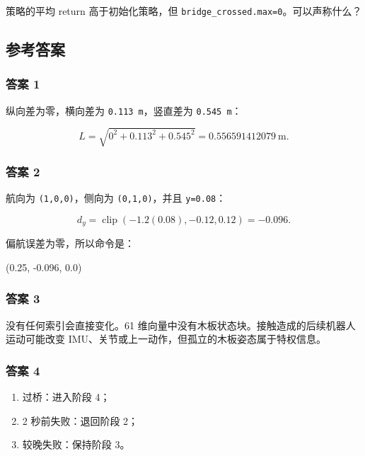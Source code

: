 \documentclass[
  chinese,
  11pt,
  letterpaper,
]{article}
\newenvironment{Shaded}{\begin{snugshade}}{\end{snugshade}}
\newcommand{\NormalTok}[1]{#1}
\providecommand{\tightlist}{%
  \setlength{\itemsep}{0pt}\setlength{\parskip}{0pt}}
\renewenvironment{Shaded}{\par\smallskip}{\par\smallskip}
\begin{document}
策略的平均 return 高于初始化策略，但
\texttt{bridge\_crossed.max=0}。可以声称什么？

\subsection{参考答案}\label{ux53c2ux8003ux7b54ux6848-1}

\subsubsection{答案 1}\label{ux7b54ux6848-1}

纵向差为零，横向差为 \texttt{0.113\ m}，竖直差为 \texttt{0.545\ m}：

\[
L=\sqrt{0^2+0.113^2+0.545^2}
=0.556591412079\ \text{m}.
\]

\subsubsection{答案 2}\label{ux7b54ux6848-2}

航向为 \texttt{(1,0,0)}，侧向为 \texttt{(0,1,0)}，并且 \texttt{y=0.08}：

\[
d_y=\operatorname{clip}(-1.2(0.08),-0.12,0.12)
=-0.096.
\]

偏航误差为零，所以命令是：

\begin{Shaded}
\begin{Highlighting}[]
\NormalTok{(0.25, {-}0.096, 0.0)}
\end{Highlighting}
\end{Shaded}

\subsubsection{答案 3}\label{ux7b54ux6848-3}

没有任何索引会直接变化。61
维向量中没有木板状态块。接触造成的后续机器人运动可能改变
IMU、关节或上一动作，但孤立的木板姿态属于特权信息。

\subsubsection{答案 4}\label{ux7b54ux6848-4}

\begin{enumerate}
\def\labelenumi{\arabic{enumi}.}
\tightlist
\item
  过桥：进入阶段 4；
\item
  2 秒前失败：退回阶段 2；
\item
  较晚失败：保持阶段 3。
\end{enumerate}
\end{document}
